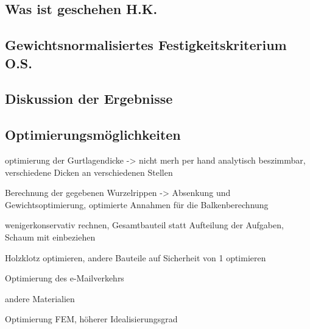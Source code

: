 \subsection{Was ist geschehen H.K.}
\subsection{Gewichtsnormalisiertes Festigkeitskriterium O.S.}
\subsection{Diskussion der Ergebnisse}
\subsection{Optimierungsmöglichkeiten}
optimierung der Gurtlagendicke -> nicht merh per hand analytisch beszimmbar, verschiedene Dicken an verschiedenen Stellen

Berechnung der gegebenen Wurzelrippen -> Absenkung und Gewichtsoptimierung, optimierte Annahmen für die Balkenberechnung

wenigerkonservativ rechnen, Gesamtbauteil statt Aufteilung der Aufgaben, Schaum mit einbeziehen

Holzklotz optimieren, andere Bauteile auf Sicherheit von 1 optimieren

Optimierung des e-Mailverkehrs

andere Materialien 

Optimierung FEM, höherer Idealisierungsgrad
